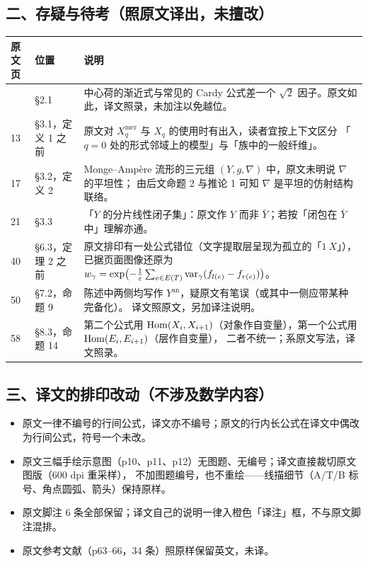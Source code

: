 \subsection*{二、存疑与待考（照原文译出，未擅改）}

\begin{longtable}{@{}p{}p{}p{}@{}}
\toprule
\textbf{原文页} & \textbf{位置} & \textbf{说明} \\
\midrule
\endhead
\bottomrule
\endfoot
5 & \S2.1 & 中心荷的渐近式与常见的 Cardy 公式差一个 $\sqrt{2}$ 因子。原文如此，译文照录，未加注以免越位。\\
13 & \S3.1，定义 1 之前 & 原文对 $X^{\mathrm{mer}}_q$ 与 $X_q$ 的使用时有出入，读者宜按上下文区分
「$q=0$ 处的形式邻域上的模型」与「族中的一般纤维」。\\
17 & \S3.2，定义 2 & Monge--Ampère 流形的三元组 $(Y,g,\nabla)$ 中，原文未明说 $\nabla$ 的平坦性；
由后文命题 2 与推论 1 可知 $\nabla$ 是平坦的仿射结构联络。\\
21 & \S3.3 & 「$Y$ 的分片线性闭子集」：原文作 $Y$ 而非 $\bar Y$；若按「闭包在 $\bar Y$ 中」理解亦通。\\
40 & \S6.3，定理 2 之前 & 原文排印有一处公式错位（文字提取层呈现为孤立的「$1\ X$」），
已据页面图像还原为 $w_{\gamma}=\exp\bigl(-\tfrac{1}{\varepsilon}\sum_{e\in E(T)}\mathrm{var}_{\gamma}(f_{l(e)}-f_{r(e)})\bigr)$。\\
50 & \S7.2，命题 9 & 陈述中两侧均写作 $Y^{\mathrm{an}}$，疑原文有笔误（或其中一侧应带某种完备化）。
译文照原文，另加译注说明。\\
58 & \S8.3，命题 14 & 第二个公式用 $\operatorname{Hom}(X_i,X_{i+1})$（对象作自变量），第一个公式用 $\operatorname{Hom}(E_i,E_{i+1})$（层作自变量），
二者不统一；系原文写法，译文照录。\\
\end{longtable}

\subsection*{三、译文的排印改动（不涉及数学内容）}

\begin{itemize}[leftmargin=1.8em,itemsep=2pt]
\item 原文一律不编号的行间公式，译文亦不编号；原文的行内长公式在译文中偶改为行间公式，符号一个未改。
\item 原文三幅手绘示意图（p10、p11、p12）无图题、无编号；译文直接裁切原文图版（600 dpi 重采样），
不加图题编号，也不重绘——线描细节（A/T/B 标号、角点圆弧、箭头）保持原样。
\item 原文脚注 6 条全部保留；译文自己的说明一律入橙色「译注」框，不与原文脚注混排。
\item 原文参考文献（p63--66，34 条）照原样保留英文，未译。
\end{itemize}
